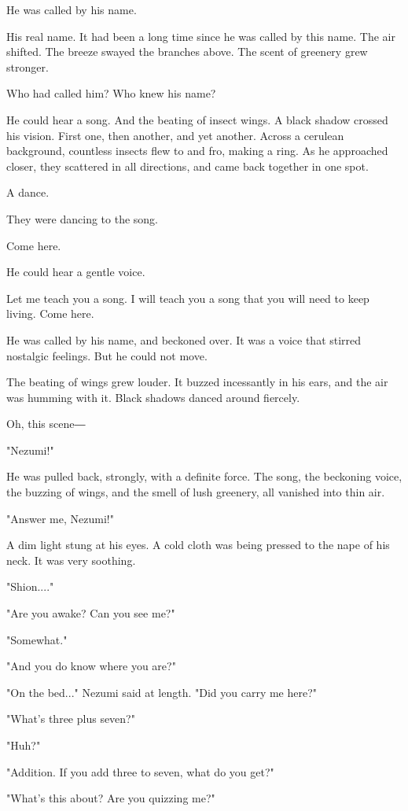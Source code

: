 He was called by his name.

His real name. It had been a long time since he was called by this name.
The air shifted. The breeze swayed the branches above. The scent of
greenery grew stronger.

Who had called him? Who knew his name?

He could hear a song. And the beating of insect wings. A black shadow
crossed his vision. First one, then another, and yet another. Across a
cerulean background, countless insects flew to and fro, making a ring.
As he approached closer, they scattered in all directions, and came back
together in one spot.

A dance.

They were dancing to the song.

Come here.

He could hear a gentle voice.

Let me teach you a song. I will teach you a song that you will need to
keep living. Come here.

He was called by his name, and beckoned over. It was a voice that
stirred nostalgic feelings. But he could not move.

The beating of wings grew louder. It buzzed incessantly in his ears, and
the air was humming with it. Black shadows danced around fiercely.

Oh, this scene―

"Nezumi!"

He was pulled back, strongly, with a definite force. The song, the
beckoning voice, the buzzing of wings, and the smell of lush greenery,
all vanished into thin air.

"Answer me, Nezumi!"

A dim light stung at his eyes. A cold cloth was being pressed to the
nape of his neck. It was very soothing.

"Shion...."

"Are you awake? Can you see me?"

"Somewhat."

"And you do know where you are?"

"On the bed..." Nezumi said at length. "Did you carry me here?"

"What's three plus seven?"

"Huh?"

"Addition. If you add three to seven, what do you get?"

"What's this about? Are you quizzing me?"

